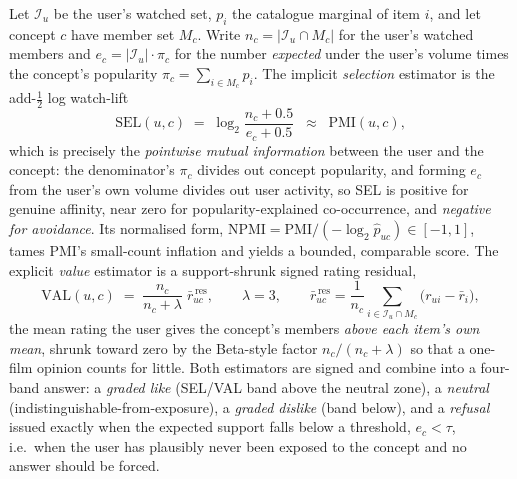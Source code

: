 \documentclass[11pt]{article}
\begin{document}
Let $\mathcal I_u$ be the user's watched set, $p_i$ the catalogue marginal of item $i$, and let concept $c$ have member
set $M_c$. Write $n_c=|\mathcal I_u\cap M_c|$ for the user's watched members and $e_c=|\mathcal I_u|\cdot\pi_c$ for the
number \emph{expected} under the user's volume times the concept's popularity $\pi_c=\sum_{i\in M_c}p_i$. The implicit
\emph{selection} estimator is the add-$\tfrac12$ log watch-lift
\begin{equation}\label{eq:sel}
  \mathrm{SEL}(u,c) \;=\; \log_2\frac{n_c+0.5}{e_c+0.5}
  \;\;\approx\;\; \mathrm{PMI}(u,c),
\end{equation}
which is precisely the \emph{pointwise mutual information} between the user and the concept: the denominator's $\pi_c$
divides out concept popularity, and forming $e_c$ from the user's own volume divides out user activity, so SEL is
positive for genuine affinity, near zero for popularity-explained co-occurrence, and \emph{negative for avoidance}.
Its normalised form, $\mathrm{NPMI}=\mathrm{PMI}/(-\log_2 \hat p_{uc})\in[-1,1]$, tames PMI's
small-count inflation and yields a bounded, comparable score. The explicit \emph{value} estimator is a support-shrunk
signed rating residual,
\begin{equation}\label{eq:val}
  \mathrm{VAL}(u,c) \;=\; \frac{n_c}{n_c+\lambda}\;\bar r^{\,\mathrm{res}}_{uc},
  \qquad \lambda=3,\qquad
  \bar r^{\,\mathrm{res}}_{uc}=\frac{1}{n_c}\!\!\sum_{i\in\mathcal I_u\cap M_c}\!\!\bigl(r_{ui}-\bar r_i\bigr),
\end{equation}
the mean rating the user gives the concept's members \emph{above each item's own mean}, shrunk toward zero by the
Beta-style factor $n_c/(n_c+\lambda)$ so that a one-film opinion counts for little. Both estimators are signed and
combine into a four-band answer: a \emph{graded like} (SEL/VAL band above the neutral zone), a \emph{neutral}
(indistinguishable-from-exposure), a \emph{graded dislike} (band below), and a \emph{refusal} issued exactly when the
expected support falls below a threshold, $e_c<\tau$, i.e.\ when the user has plausibly never been exposed to the
concept and no answer should be forced.
\end{document}
